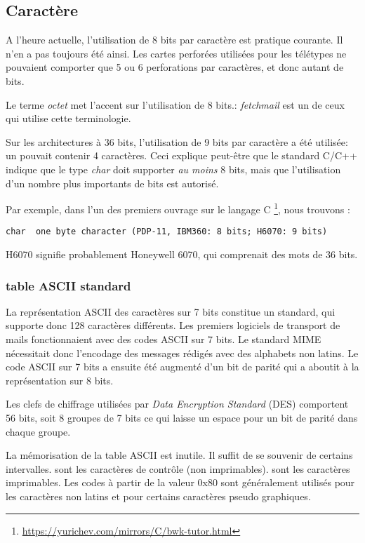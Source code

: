 \subsection{Caractère}

A l'heure actuelle, l'utilisation de 8 bits par caractère est pratique courante.
Il n'en a pas toujours été ainsi.
Les cartes perforées utilisées pour les télétypes ne pouvaient comporter que 5 ou 6 perforations par caractères, et donc autant de bits.

Le terme \emph{octet} met l'accent sur l'utilisation de 8 bits.:
\emph{fetchmail} est un de ceux qui utilise cette terminologie.

Sur les architectures à 36 bits, l'utilisation de 9 bits par caractère a été utilisée: un  pouvait contenir 4 caractères.
Ceci explique peut-être que le standard C/C++ indique que le type \emph{char} doit supporter \emph{au moins} 8 bits, mais que l'utilisation
d'un nombre plus importants de bits est autorisé.

Par exemple, dans l'un des premiers ouvrage sur le langage C \footnote{\url{https://yurichev.com/mirrors/C/bwk-tutor.html}}, nous trouvons :

\begin{lstlisting}
char  one byte character (PDP-11, IBM360: 8 bits; H6070: 9 bits)
\end{lstlisting}

H6070 signifie probablement Honeywell 6070, qui comprenait des mots de 36 bits.

\subsubsection{table ASCII standard}

La représentation ASCII des caractères sur 7 bits constitue un standard, qui supporte donc 128 caractères différents.
Les premiers logiciels de transport de mails fonctionnaient avec des codes ASCII sur 7 bits.
Le standard \ac{MIME} nécessitait donc l'encodage des messages rédigés avec des alphabets non latins.
Le code ASCII sur 7 bits a ensuite été augmenté d'un bit de parité qui a aboutit à la représentation sur 8 bits.

Les clefs de chiffrage utilisées par \emph{Data Encryption Standard} (\ac{DES}) comportent 56 bits, soit 8 groupes de 7 bits
ce qui laisse un espace pour un bit de parité dans chaque groupe.

La mémorisation de la table \ac{ASCII} est inutile. Il suffit de se souvenir de certains intervalles.
 sont les caractères de contrôle (non imprimables).
 sont les caractères imprimables.
Les codes à partir de la valeur 0x80 sont généralement utilisés pour les caractères non latins et pour certains caractères pseudo graphiques.

